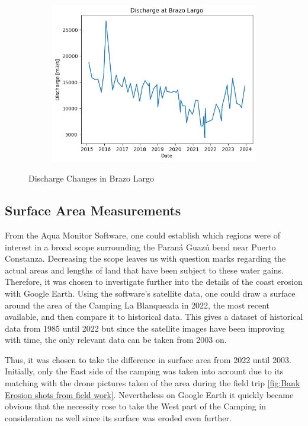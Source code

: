\begin{figure}[H]
    \centering
    \begin{subfigure}{0.48\textwidth}
        \includegraphics[width=\linewidth]{figures/ch5/dischargepeak.jpg}
    \end{subfigure}
    
    \caption{Discharge Changes in Brazo Largo}
    \label{fig:Discharge Changes in Brazo Largo}
\end{figure}




\subsection{Surface Area Measurements}
From the Aqua Monitor Software, one could establish which regions were of interest in a broad scope surrounding the Paraná Guazú bend near Puerto Constanza. Decreasing the scope leaves us with question marks regarding the actual areas and lengths of land that have been subject to these water gains. Therefore, it was chosen to investigate further into the details of the coast erosion with Google Earth.
Using the software's satellite data, one could draw a surface around the area of the Camping La Blanqueada in 2022, the most recent available, and then compare it to historical data. 
This gives a dataset of historical data from 1985 until 2022 but since the satellite images have been improving with time, the only relevant data can be taken from 2003 on.


Thus, it was chosen to take the difference in surface area from 2022 until 2003. Initially, only the East side of the camping was taken into account due to its matching with the drone pictures taken of the area during the field trip \ref{fig:Bank Erosion shots from field work}. Nevertheless on Google Earth it quickly became obvious that the necessity rose to take the West part of the Camping in consideration as well since its surface was eroded even further.

